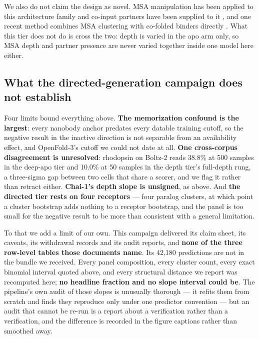We also do not claim the design as novel. MSA manipulation has been applied to
this architecture family \citep{kalakoti2026afsample3} and co-input partners have
been supplied to it \citep{chiesa2025templatebias,zhang2026generalization}, and
one recent method combines MSA clustering with co-folded binders directly
\citep{cheng2026af3cluster}. What this tier does not do is cross the two: depth
is varied in the apo arm only, so MSA depth and partner presence are never
varied together inside one model here either.

\subsection*{What the directed-generation campaign does not establish}

Four limits bound everything above. \textbf{The memorization confound is the
largest}: every nanobody anchor predates every datable training cutoff, so the
negative result in the inactive direction is not separable from an availability
effect, and OpenFold-3's cutoff we could not date at all. \textbf{One
cross-corpus disagreement is unresolved}: rhodopsin on Boltz-2 reads 38.8\% at
500 samples in the deep-apo tier and 10.0\% at 50 samples in the depth tier's
full-depth rung, a three-sigma gap between two cells that share a scorer, and we
flag it rather than retract either. \textbf{Chai-1's depth slope is unsigned},
as above. And \textbf{the directed tier rests on four receptors} --- four
paralog clusters, at which point a cluster bootstrap adds nothing to a receptor
bootstrap, and the panel is too small for the negative result to be more than
consistent with a general limitation.

To that we add a limit of our own. This campaign delivered its claim sheet, its
caveats, its withdrawal records and its audit reports, and \textbf{none of the
three row-level tables those documents name}. Its 42{,}180 predictions are not
in the bundle we received. Every panel composition, every cluster count, every
exact binomial interval quoted above, and every structural distance we report
was recomputed here; \textbf{no headline fraction and no slope interval could
be}. The pipeline's own audit of those slopes is unusually thorough --- it
refits them from scratch and finds they reproduce only under one predictor
convention --- but an audit that cannot be re-run is a report about a
verification rather than a verification, and the difference is recorded in the
figure captions rather than smoothed away.

